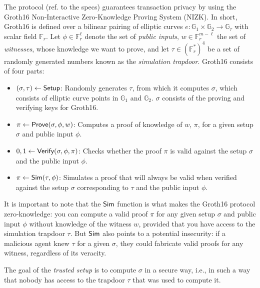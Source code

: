 
The \MantaPay{} protocol (ref. to the specs) guarantees transaction privacy by using the Groth16 \cite{groth16} Non-Interactive Zero-Knowledge Proving System (NIZK). In short, Groth16 is defined over a bilinear pairing of elliptic curves $e: \mathbb{G}_1 \times \mathbb{G}_2 \rightarrow \mathbb{G}_\tau$ with scalar field $\mathbb{F}_r$. Let $\phi \in \mathbb{F}_r^\ell$ denote the set of \emph{public inputs}, $w \in \mathbb{F}_r^{m-\ell}$ the set of \emph{witnesses}, whose knowledge we want to prove, and let $\tau \in (\mathbb{F}_r^{*})^4$ be a set of randomly generated numbers known as the \emph{simulation trapdoor}. Groth16 consists of four parts:
\begin{itemize}
\item $(\sigma, \tau) \leftarrow {\textsf{Setup}}$: Randomly generates $\tau$, from which it computes $\sigma$, which consists of elliptic curve points in $\mathbb{G}_1$ and $\mathbb{G}_2$. $\sigma$ consists of the proving and verifying keys for Groth16.
\item $\pi \leftarrow {\textsf{Prove}}(\sigma, \phi, w)$: Computes a proof of knowledge of $w$, $\pi$, for a given setup $\sigma$ and public input $\phi$.
\item $0, 1 \leftarrow {\textsf{Verify}}(\sigma, \phi, \pi)$: Checks whether the proof $\pi$ is valid against the setup $\sigma$ and the public input $\phi$.
\item $\pi \leftarrow {\textsf{Sim}}(\tau, \phi)$: Simulates a proof that will always be valid when verified against the setup $\sigma$ corresponding to $\tau$ and the public input $\phi$.
\end{itemize}

It is important to note that the ${\textsf{Sim}}$ function is what makes the Groth16 protocol zero-knowledge: you can compute a valid proof $\pi$ for any given setup $\sigma$ and public input $\phi$ without knowledge of the witness $w$, provided that you have access to the simulation trapdoor $\tau$. But ${\textsf{Sim}}$ also points to a potential insecurity: if a malicious agent knew $\tau$ for a given $\sigma$, they could fabricate valid proofs for any witness, regardless of its veracity. 

The goal of the \emph{trusted setup} is to compute $\sigma$ in a secure way, i.e., in such a way that nobody has access to the trapdoor $\tau$ that was used to compute it.
